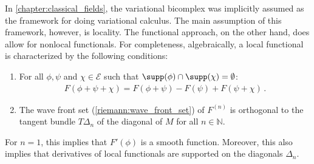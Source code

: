     \begin{remark}
        In \cref{chapter:classical_fields}, the variational bicomplex was implicitly assumed as the framework for doing variational calculus. The main assumption of this framework, however, is locality. The functional approach, on the other hand, does allow for nonlocal functionals. For completeness, algebraically, a local functional is characterized by the following conditions:
        \begin{enumerate}
            \item For all $\phi,\psi$ and $\chi\in\mathcal{E}$ such that $\supp(\phi)\cap\supp(\chi)=\emptyset$:
                \begin{gather}
                    F(\phi+\psi+\chi)=F(\phi+\psi)-F(\psi)+F(\psi+\chi)\,.
                \end{gather}
            \item The wave front set (\cref{riemann:wave_front_set}) of $F^{(n)}$ is orthogonal to the tangent bundle $T\Delta_n$ of the diagonal of $M$ for all $n\in\mathbb{N}$.
        \end{enumerate}
        For $n=1$, this implies that $F'(\phi)$ is a smooth function. Moreover, this also implies that derivatives of local functionals are supported on the diagonals $\Delta_n$.
    \end{remark}

